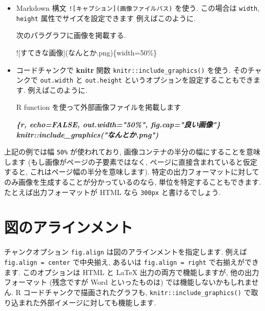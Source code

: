 \documentclass[
  11pt,
  lualatex,
  ja=standard]{bxjsreport}
\newenvironment{Shaded}{\begin{snugshade}}{\end{snugshade}}
\newcommand{\AlertTok}[1]{\textcolor[rgb]{0.94,0.16,0.16}{#1}}
\newcommand{\InformationTok}[1]{\textcolor[rgb]{0.56,0.35,0.01}{\textbf{\textit{#1}}}}
\newcommand{\NormalTok}[1]{#1}
\begin{document}
\begin{itemize}
\item
  Markdown 構文 \texttt{!{[}キャプション{]}(画像ファイルパス)} を使う. この場合は \texttt{width}, \texttt{height} 属性でサイズを設定できます 例えばこのように.

\begin{Shaded}
\begin{Highlighting}[]
\NormalTok{次のパラグラフに画像を掲載する.}

\AlertTok{![すてきな画像](なんとか.png)}\NormalTok{\{width=50\%\}}
\end{Highlighting}
\end{Shaded}
\item
  コードチャンクで \textbf{knitr} 関数 \texttt{knitr::include\_graphics()} を使う. そのチャンクで \texttt{out.width} と \texttt{out.height} というオプションを設定することもできます. 例えばこのように.

\begin{Shaded}
\begin{Highlighting}[]
\NormalTok{R function を使って外部画像ファイルを掲載します}

\InformationTok{\textasciigrave{}\textasciigrave{}\textasciigrave{}\{r, echo=FALSE, out.width="50\%", fig.cap="良い画像"\}}
\InformationTok{knitr::include\_graphics("なんとか.png")}
\InformationTok{\textasciigrave{}\textasciigrave{}\textasciigrave{}}
\end{Highlighting}
\end{Shaded}
\end{itemize}

上記の例では幅 \texttt{50\%} が使われており, 画像コンテナの半分の幅にすることを意味します (もし画像がページの子要素ではなく, ページに直接含まれていると仮定すると, これはページ幅の半分を意味します). 特定の出力フォーマットに対してのみ画像を生成することが分かっているのなら, 単位を特定することもできます. たとえば出力フォーマットが HTML なら \texttt{300px} と書けるでしょう.

\hypertarget{fig-align}{%
\section{図のアラインメント}\label{fig-align}}

チャンクオプション \texttt{fig.align} は図のアラインメントを指定します. 例えば \texttt{fig.align = \textquotesingle{}center\textquotesingle{}} で中央揃え, あるいは \texttt{fig.align = \textquotesingle{}right\textquotesingle{}} で右揃えができます. このオプションは HTML と LaTeX 出力の両方で機能しますが, 他の出力フォーマット (残念ですが Word といったものは) では機能しないかもしれません. R コードチャンクで描画されたグラフも, \texttt{knitr::include\_graphics()} で取り込まれた外部イメージに対しても機能します.
\end{document}
